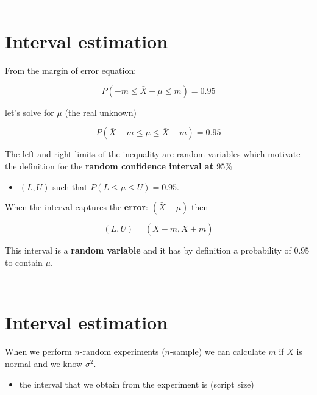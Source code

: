 \documentclass[
]{book}
\providecommand{\tightlist}{%
  \setlength{\itemsep}{0pt}\setlength{\parskip}{0pt}}
\begin{document}
\begin{center}\rule{0.5\linewidth}{0.5pt}\end{center}

\hypertarget{interval-estimation-2}{%
\section{Interval estimation}\label{interval-estimation-2}}

From the margin of error equation:

\[P(-m \leq \bar{X} - \mu \leq  m)=0.95\]

let's solve for \(\mu\) (the real unknown)

\[P(\bar{X} - m \leq \mu \leq \bar{X} + m)=0.95\]

The left and right limits of the inequality are random variables which motivate the definition for the \textbf{random confidence interval at \(95\%\)}

\begin{itemize}
\tightlist
\item
  \((L,U)\) such that \(P(L \leq \mu \leq U )=0.95\).
\end{itemize}

When the interval captures the \textbf{error}: \((\bar{X}-\mu)\) then

\[(L,U)=(\bar{X} - m,\bar{X} + m)\]

This interval is a \textbf{random variable} and it has by definition a probability of \(0.95\) to contain \(\mu\).

\begin{center}\rule{0.5\linewidth}{0.5pt}\end{center}

\begin{center}\rule{0.5\linewidth}{0.5pt}\end{center}

\hypertarget{interval-estimation-3}{%
\section{Interval estimation}\label{interval-estimation-3}}

When we perform \(n\)-random experiments (\(n\)-sample) we can calculate \(m\) if \(X\) is normal and we know \(\sigma^2\).

\begin{itemize}
\tightlist
\item
  the interval that we obtain from the experiment is (script size)
\end{itemize}
\end{document}
